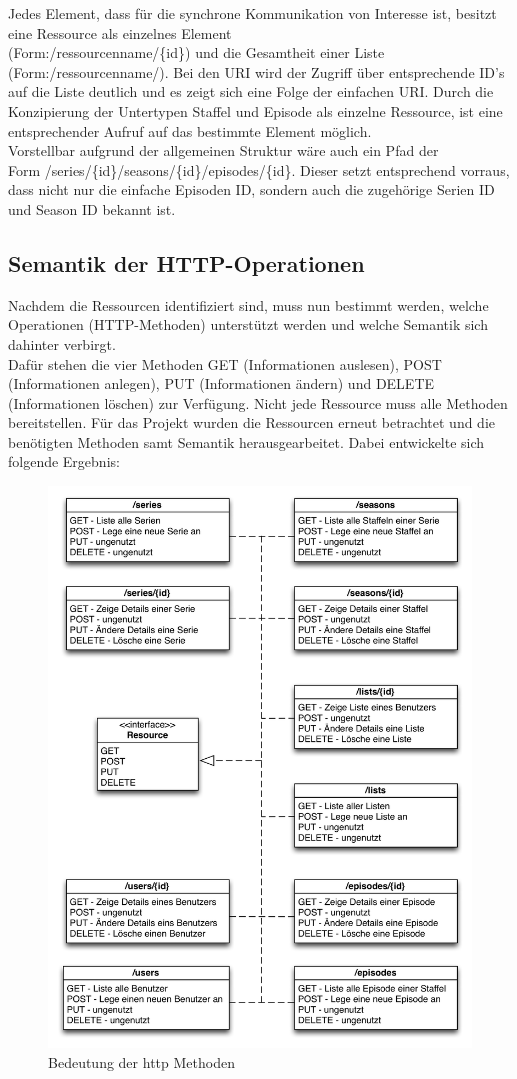 Jedes Element, dass für die synchrone Kommunikation von Interesse ist, besitzt eine Ressource als einzelnes Element\\
(Form:/ressourcenname/\{id\}) und die Gesamtheit einer Liste (Form:/ressourcenname/). Bei den URI wird der Zugriff über entsprechende ID's auf die Liste deutlich und es zeigt sich eine Folge der einfachen URI. Durch die Konzipierung der Untertypen Staffel und Episode als einzelne Ressource, ist eine entsprechender Aufruf auf das bestimmte Element möglich.\\
Vorstellbar aufgrund der allgemeinen Struktur wäre auch ein Pfad der \\
Form /series/\{id\}/seasons/\{id\}/episodes/\{id\}.  Dieser setzt entsprechend vorraus, dass nicht nur die einfache Episoden ID, sondern auch die zugehörige Serien ID und Season ID bekannt ist.

\subsection{Semantik der HTTP-Operationen}

Nachdem die Ressourcen identifiziert sind, muss nun bestimmt werden, welche Operationen (HTTP-Methoden) unterstützt werden und welche Semantik sich dahinter verbirgt.\\
Dafür stehen die vier Methoden GET (Informationen auslesen), POST (Informationen anlegen), PUT (Informationen ändern) und DELETE (Informationen löschen) zur Verfügung. Nicht jede Ressource muss alle Methoden bereitstellen. Für das Projekt wurden die Ressourcen erneut betrachtet und die benötigten Methoden samt Semantik herausgearbeitet. Dabei entwickelte sich folgende Ergebnis:

\begin{figure}[H]
\includegraphics[width=.9\textwidth]{../images/bedeutunghttpmethoden.png}
\caption{Bedeutung der http Methoden}
\label{bedeutunghttpmethoden}
\end{figure}
